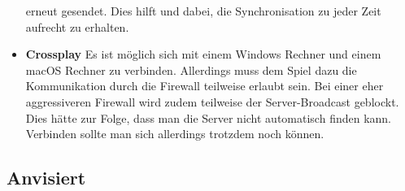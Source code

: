 \begin{itemize}
        erneut gesendet. Dies hilft und dabei, die Synchronisation zu jeder Zeit aufrecht zu erhalten.
    \item \textbf{Crossplay}
        Es ist möglich sich mit einem Windows Rechner und einem macOS Rechner zu verbinden. Allerdings muss dem Spiel dazu die Kommunikation durch die Firewall teilweise erlaubt sein.
        Bei einer eher aggressiveren Firewall wird zudem teilweise der Server-Broadcast geblockt. Dies hätte zur Folge, dass man die Server nicht automatisch finden kann. 
        Verbinden sollte man sich allerdings trotzdem noch können.   
\end{itemize}

\subsection*{Anvisiert}
